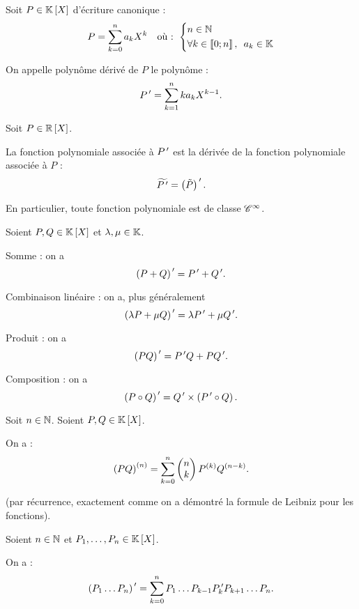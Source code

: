 \begin{defi}
Soit \(P\in\poly\) d'écriture canonique : \[P=\sum_{k=0}^{n}a_kX^k\quad\text{où : }\begin{dcases}n\in\N \\ \quantifs{\forall k\in\interventierii{0}{n}}a_k\in\K\end{dcases}\]

On appelle polynôme dérivé de \(P\) le polynôme : \[P\prim=\sum_{k=1}^{n}ka_kX^{k-1}.\]
\end{defi}

\begin{rem}
Soit \(P\in\poly[\R]\).

La fonction polynomiale associée à \(P\prim\) est la dérivée de la fonction polynomiale associée à \(P\) : \[\widetilde{P\prim}=\paren{\tilde{P}}\prim.\]

En particulier, toute fonction polynomiale est de classe \(\classe{\infty}\).
\end{rem}

\begin{prop}
Soient \(P,Q\in\poly\) et \(\lambda,\mu\in\K\).

Somme : on a \[\paren{P+Q}\prim=P\prim+Q\prim.\]

Combinaison linéaire : on a, plus généralement \[\paren{\lambda P+\mu Q}\prim=\lambda P\prim+\mu Q\prim.\]

Produit : on a \[\paren{PQ}\prim=P\prim Q+PQ\prim.\]

Composition : on a \[\paren{P\rond Q}\prim=Q\prim\times\paren{P\prim\rond Q}.\]
\end{prop}

\begin{dem}
\end{dem}

\begin{prop}
Soit \(n\in\N\). Soient \(P,Q\in\poly\).

On a : \[\paren{PQ}\deriv{n}=\sum_{k=0}^{n}\binom{k}{n}P\deriv{k}Q\deriv{n-k}.\]
\end{prop}

\begin{dem}
 (par récurrence, exactement comme on a démontré la formule de Leibniz pour les fonctions).
\end{dem}

\begin{rem}
Soient \(n\in\N\) et \(P_1,\dots,P_n\in\poly\).

On a : \[\paren{P_1\dots P_n}\prim=\sum_{k=0}^{n}P_1\dots P_{k-1}P_k\prim P_{k+1}\dots P_n.\]
\end{rem}

